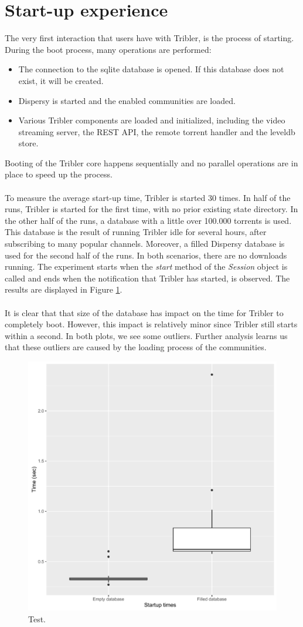 \section{Start-up experience}
The very first interaction that users have with Tribler, is the process of starting. During the boot process, many operations are performed:
\begin{itemize}
	\item The connection to the sqlite database is opened. If this database does not exist, it will be created.
	\item Dispersy is started and the enabled communities are loaded.
	\item Various Tribler components are loaded and initialized, including the video streaming server, the REST API, the remote torrent handler and the leveldb store.
\end{itemize}
Booting of the Tribler core happens sequentially and no parallel operations are in place to speed up the process.\\\\
To measure the average start-up time, Tribler is started 30 times. In half of the runs, Tribler is started for the first time, with no prior existing state directory. In the other half of the runs, a database with a little over 100.000 torrents is used. This database is the result of running Tribler idle for several hours, after subscribing to many popular channels. Moreover, a filled Dispersy database is used for the second half of the runs. In both scenarios, there are no downloads running. The experiment starts when the \emph{start} method of the \emph{Session} object is called and ends when the notification that Tribler has started, is observed. The results are displayed in Figure \ref{fig:startup_experiment}.\\\\
It is clear that that size of the database has impact on the time for Tribler to completely boot. However, this impact is relatively minor since Tribler still starts within a second. In both plots, we see some outliers. Further analysis learns us that these outliers are caused by the loading process of the communities.

\begin{figure}[!h]
	\centering
	\includegraphics[width=0.6\columnwidth]{images/experiments/startup}
	\caption{Test.}
	\label{fig:startup_experiment}
\end{figure}

